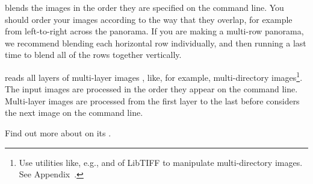 \App{} blends the images in the order they are specified on the
command line.  You should order your images according to the way that
they overlap, for example from left-to-right across the panorama.  If
you are making a multi-row panorama, we recommend blending each
horizontal row individually, and then running \App{} a last time to
blend all of the rows together vertically.

\App{} reads all layers of multi-layer images%
%
,
like, for example, multi\hyp{}directory%
%
 images\footnote{Use utilities like, e.g.,
   and
   of LibTIFF to manipulate
  multi-directory  images.  See
  Appendix~.}.  The input images are
processed in the order they appear on the command line.  Multi-layer
images are processed from the first layer to the last before \App{}
considers the next image on the command line.

Find out more about \App{} on its
.

